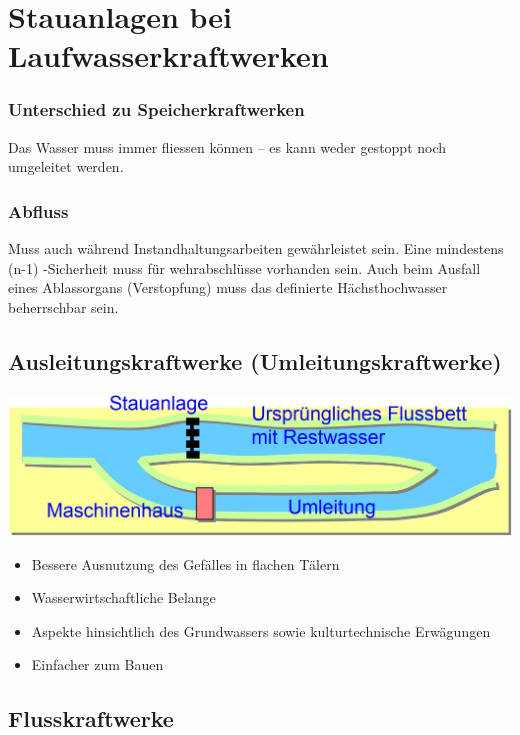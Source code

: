 \section{Stauanlagen bei Laufwasserkraftwerken}


\subsubsection{Unterschied zu Speicherkraftwerken}
Das Wasser muss immer fliessen können – es kann weder gestoppt noch umgeleitet werden.

\subsubsection{Abfluss}
Muss auch während Instandhaltungsarbeiten gewährleistet sein. Eine mindestens (n-1) -Sicherheit muss für wehrabschlüsse vorhanden sein.
Auch beim Ausfall eines Ablassorgans (Verstopfung) muss das definierte Hächsthochwasser beherrschbar sein.

\subsection{Ausleitungskraftwerke (Umleitungskraftwerke)}

\vspace{0.15cm}

\includegraphics[width=0.98\columnwidth, align=c]{images/Ausleitungskraftwerke.jpg}
\begin{itemize}
  \item Bessere Ausnutzung des Gefälles in flachen Tälern
  \item Wasserwirtschaftliche Belange
  \item Aspekte hinsichtlich des Grundwassers sowie kulturtechnische Erwägungen
  \item Einfacher zum Bauen
\end{itemize}



\subsection{Flusskraftwerke}


